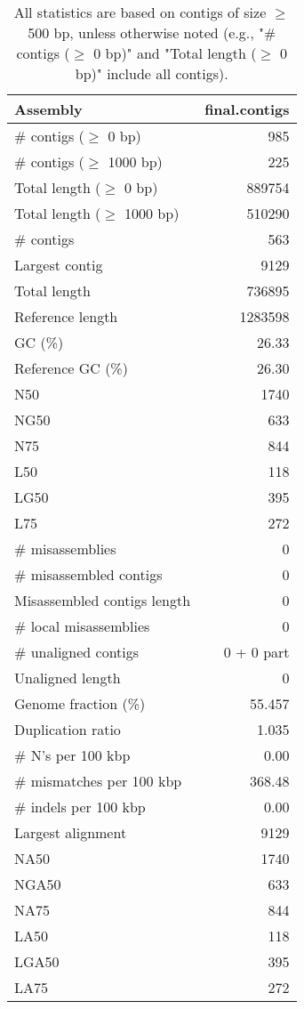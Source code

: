 \documentclass[12pt,a4paper]{article}
\begin{document}
\begin{table}[ht]
\begin{center}
\caption{All statistics are based on contigs of size $\geq$ 500 bp, unless otherwise noted (e.g., "\# contigs ($\geq$ 0 bp)" and "Total length ($\geq$ 0 bp)" include all contigs).}
\begin{tabular}{|l*{1}{|r}|}
\hline
Assembly & final.contigs \\ \hline
\# contigs ($\geq$ 0 bp) & 985 \\ \hline
\# contigs ($\geq$ 1000 bp) & 225 \\ \hline
Total length ($\geq$ 0 bp) & 889754 \\ \hline
Total length ($\geq$ 1000 bp) & 510290 \\ \hline
\# contigs & 563 \\ \hline
Largest contig & 9129 \\ \hline
Total length & 736895 \\ \hline
Reference length & 1283598 \\ \hline
GC (\%) & 26.33 \\ \hline
Reference GC (\%) & 26.30 \\ \hline
N50 & 1740 \\ \hline
NG50 & 633 \\ \hline
N75 & 844 \\ \hline
L50 & 118 \\ \hline
LG50 & 395 \\ \hline
L75 & 272 \\ \hline
\# misassemblies & 0 \\ \hline
\# misassembled contigs & 0 \\ \hline
Misassembled contigs length & 0 \\ \hline
\# local misassemblies & 0 \\ \hline
\# unaligned contigs & 0 + 0 part \\ \hline
Unaligned length & 0 \\ \hline
Genome fraction (\%) & 55.457 \\ \hline
Duplication ratio & 1.035 \\ \hline
\# N's per 100 kbp & 0.00 \\ \hline
\# mismatches per 100 kbp & 368.48 \\ \hline
\# indels per 100 kbp & 0.00 \\ \hline
Largest alignment & 9129 \\ \hline
NA50 & 1740 \\ \hline
NGA50 & 633 \\ \hline
NA75 & 844 \\ \hline
LA50 & 118 \\ \hline
LGA50 & 395 \\ \hline
LA75 & 272 \\ \hline
\end{tabular}
\end{center}
\end{table}
\end{document}
